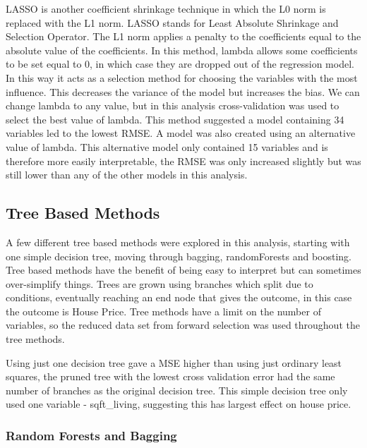 \documentclass[
]{article}
\begin{document}
LASSO is another coefficient shrinkage technique in which the L0 norm is
replaced with the L1 norm. LASSO stands for Least Absolute Shrinkage and
Selection Operator. The L1 norm applies a penalty to the coefficients
equal to the absolute value of the coefficients. In this method, lambda
allows some coefficients to be set equal to 0, in which case they are
dropped out of the regression model. In this way it acts as a selection
method for choosing the variables with the most influence. This
decreases the variance of the model but increases the bias. We can
change lambda to any value, but in this analysis cross-validation was
used to select the best value of lambda. This method suggested a model
containing 34 variables led to the lowest RMSE. A model was also created
using an alternative value of lambda. This alternative model only
contained 15 variables and is therefore more easily interpretable, the
RMSE was only increased slightly but was still lower than any of the
other models in this analysis.

\hypertarget{tree-based-methods}{%
\subsection{Tree Based Methods}\label{tree-based-methods}}

A few different tree based methods were explored in this analysis,
starting with one simple decision tree, moving through bagging,
randomForests and boosting. Tree based methods have the benefit of being
easy to interpret but can sometimes over-simplify things. Trees are
grown using branches which split due to conditions, eventually reaching
an end node that gives the outcome, in this case the outcome is House
Price. Tree methods have a limit on the number of variables, so the
reduced data set from forward selection was used throughout the tree
methods.

Using just one decision tree gave a MSE higher than using just ordinary
least squares, the pruned tree with the lowest cross validation error
had the same number of branches as the original decision tree. This
simple decision tree only used one variable - sqft\_living, suggesting
this has largest effect on house price.

\hypertarget{random-forests-and-bagging}{%
\subsubsection{Random Forests and
Bagging}\label{random-forests-and-bagging}}
\end{document}
